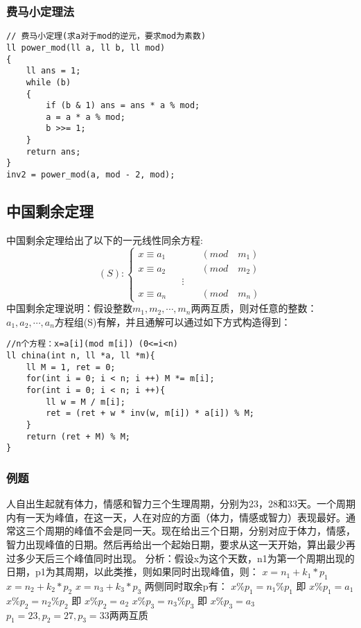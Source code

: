 \subsubsection{费马小定理法}
\begin{lstlisting}
// 费马小定理(求a对于mod的逆元，要求mod为素数)
ll power_mod(ll a, ll b, ll mod)
{
	ll ans = 1;
	while (b)
	{
		if (b & 1) ans = ans * a % mod;
		a = a * a % mod;
		b >>= 1;
	}
	return ans;
}
inv2 = power_mod(a, mod - 2, mod);
\end{lstlisting}

\subsection{中国剩余定理}
中国剩余定理给出了以下的一元线性同余方程:
$$
(S):
\left\{
\begin{array}{rcl}
	x\equiv a_1 & &\qquad(mod\quad m_1) \\
	x\equiv a_2 & &\qquad(mod\quad m_2) \\
	& &\vdots \\
	x\equiv a_n & &\qquad(mod\quad m_n)
\end{array}
\right.
$$
中国剩余定理说明：假设整数$ m_1, m_2, \cdots ,m_n $两两互质，则对任意的整数：$ a_1, a_2, \cdots ,a_n $方程组(S)有解，并且通解可以通过如下方式构造得到：
\newline
\begin{lstlisting}
//n个方程：x=a[i](mod m[i]) (0<=i<n)
ll china(int n, ll *a, ll *m){
	ll M = 1, ret = 0;
	for(int i = 0; i < n; i ++) M *= m[i];
	for(int i = 0; i < n; i ++){
		ll w = M / m[i];
		ret = (ret + w * inv(w, m[i]) * a[i]) % M;
	}
	return (ret + M) % M;
}
\end{lstlisting}
\subsubsection{例题}
人自出生起就有体力，情感和智力三个生理周期，分别为23，28和33天。一个周期内有一天为峰值，在这一天，人在对应的方面（体力，情感或智力）表现最好。通常这三个周期的峰值不会是同一天。现在给出三个日期，分别对应于体力，情感，智力出现峰值的日期。然后再给出一个起始日期，要求从这一天开始，算出最少再过多少天后三个峰值同时出现。
\newline
\newline
分析：假设x为这个天数，n1为第一个周期出现的日期，p1为其周期，以此类推，则如果同时出现峰值，则：
\newline
\newline
$ x=n_1 + k_1\ast p_1 $
\newline
$ x=n_2 + k_2\ast p_2 $
\newline
$ x=n_3 + k_3\ast p_3 $
\newline
\newline
两侧同时取余p有：
\newline
$ x\%p_1=n_1\%p_1 $ 即 $ x\%p_1=a_1 $
\newline
$ x\%p_2=n_2\%p_2 $ 即 $ x\%p_2=a_2 $
\newline
$ x\%p_3=n_3\%p_3 $ 即 $ x\%p_3=a_3 $
\newline
\newline
$ p_1=23, p_2=27, p_3=33 $两两互质

